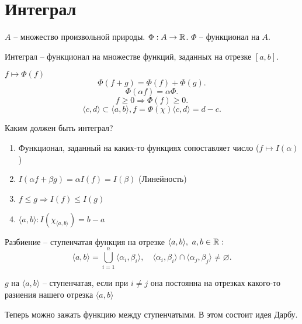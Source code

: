 \documentclass[11pt]{book}
\begin{document}
\section{Интеграл}
\begin{defn}
    $ A$ -- множество произвольной природы. $ \Phi: A \to  \mathbb{R}$. $ \Phi$ -- функционал на $ A$.
\end{defn}
\begin{defn}
    Интеграл -- функционал на множестве функций, заданных на отрезке $ [a, b]$.

    $ f \mapsto \Phi (f)$
    \[
	\Phi(f+g) = \Phi(f) + \Phi(g)
    .\]
    \[
	\Phi( \alpha  f) = \alpha \Phi
    .\]
    \[
	f \ge  0 \Longrightarrow \Phi(f) \ge 0
    .\]
    \[
	\langle c, d \rangle \subset \langle a, b \rangle, f= \Phi(\chi)  \langle c, d \rangle = d - c
    .\]
\end{defn}
\begin{st}
    Каким должен быть интеграл?
    \begin{enumerate}
	\item Функционал, заданный на каких-то функциях сопоставляет число ($ f \mapsto I( \alpha )$)
	\item $ I( \alpha  f + \beta  g) = \alpha I(f) = I ( \beta ) $ (Линейность)
	\item $ f \le  g \Longrightarrow I(f) \le  I(g)$
	\item $  \langle a, b \rangle: I(\chi _{ \langle a, b \rangle} ) = b - a$
    \end{enumerate}
\end{st}
\begin{defn}
    Разбиение -- ступенчатая функция на отрезке $ \langle a, b \rangle, ~ a, b \in  \mathbb{R}:$
    \[
	\langle a, b \rangle = \bigcup_{i= 1}^{n} \langle \alpha _i, \beta _i \rangle, \quad \langle \alpha_i , \beta _i \rangle\cap \langle \alpha _j, \beta _j \rangle  \ne \varnothing
    .\]
\end{defn}
\begin{defn}
    $ g $  на $ \langle a, b \rangle$ -- ступенчатая, если при $ i \ne j$ она постоянна  на отрезках какого-то разиения нашего отрезка $ \langle a, b \rangle$
\end{defn}
Теперь можно зажать функцию между ступенчатыми. В этом состоит идея Дарбу.
\end{document}
